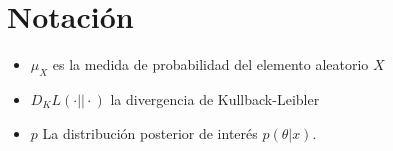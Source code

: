 \documentclass[main.tex]{subfiles}
\begin{document}
\chapter*{Notación}
\begin{itemize}
	\item $\mu_X$ es la medida de probabilidad del elemento aleatorio $X$
	\item 	$D_KL(\cdot || \cdot)$ la divergencia de Kullback-Leibler
	\item $p$ La distribución posterior de interés $p(\theta | x)$.
\end{itemize}
\end{document}

